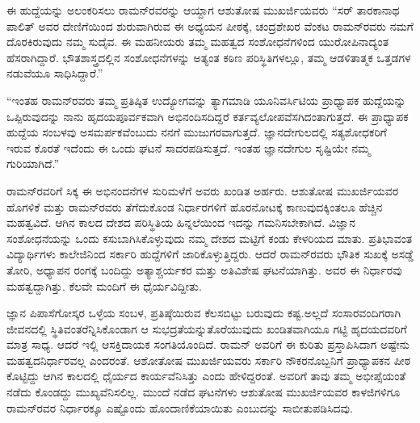 ಈ ಹುದ್ದೆಯನ್ನು ಅಲಂಕರಿಸಲು ರಾಮನ್‍ರವರನ್ನು ಆಯ್ದಾಗ ಆಶುತೋಷ ಮುಖರ್ಜಿಯವರು \enginline{-} “ಸರ್ ತಾರಕಾನಾಥ ಪಾಲಿತ್ ಅವರ ದೇಣಿಗೆಯಿಂದ ಶುರುವಾಗಿರುವ ಈ ಅಧ್ಯಯನ ಪೀಠಕ್ಕೆ, ಚಂದ್ರಶೇಖರ ವೆಂಕಟ ರಾಮನ್‍ರವರು ನಮಗೆ ದೊರಕಿರುವುದು ನಮ್ಮ ಸುದೈವ. ಈ ಮಹನೀಯರು ತಮ್ಮ ಮಹತ್ವದ ಸಂಶೋಧನೆಗಳಿಂದ ಯುರೋಪಿನಾದ್ಯಂತ ಹೆಸರಾಗಿದ್ದಾರೆ. ಭೌತಶಾಸ್ತ್ರದಲ್ಲಿನ ಸಂಶೋಧನೆಗಳನ್ನು ಅತ್ಯಂತ ಕಠಿಣ ಪರಿಸ್ಥಿತಿಗಳಲ್ಲೂ, ತಮ್ಮ ಆಡಳಿತಾತ್ಮಕ ಒತ್ತಡಗಳ ನಡುವೆಯೂ ಸಾಧಿಸಿದ್ದಾರೆ.”

“ಇಂತಹ ರಾಮನ್‍ರವರು ತಮ್ಮ ಪ್ರತಿಷ್ಠಿತ ಉದ್ಯೋಗವನ್ನು ತ್ಯಾಗಮಾಡಿ ಯೂನಿವರ್ಸಿಟಿಯ ಪ್ರಾಧ್ಯಾಪಕ ಹುದ್ದೆಯನ್ನು ಒಪ್ಪಿರುವುದನ್ನು ನಾನು ಹೃದಯಪೂರ್ವಕವಾಗಿ ಅಭಿನಂದಿಸದಿದ್ದರೆ ಕರ್ತವ್ಯಲೋಪವೆಸಗಿದಂತಾಗುತ್ತದೆ. ಈ ಪ್ರಾಧ್ಯಾಪಕ ಹುದ್ದೆಯ ಸಂಬಳವು ಅಸಮರ್ಪಕವೆಂಬುದು ನನಗೆ ಮುಜುಗರವಾಗುತ್ತದೆ. ಜ್ಞಾನದೇಗುಲದಲ್ಲಿ ಸತ್ಯಶೋಧಕರಿಗೆ ಇರುವ ಕೊರತೆ ಇದೆಂದು ಈ ಒಂದು ಘಟನೆ ಸಾದರಪಡಿಸುತ್ತದೆ. ಇಂತಹ ಜ್ಞಾನದೇಗುಲ ಸೃಷ್ಟಿಯೇ ನಮ್ಮ ಗುರಿಯಾಗಿದೆ.”

ರಾಮನ್‍ರವರಿಗೆ ಸಿಕ್ಕ ಈ ಅಭಿನಂದನೆಗಳ ಸುರಿಮಳೆಗೆ ಅವರು ಖಂಡಿತ ಅರ್ಹರು. ಆಶುತೋಷ ಮುಖರ್ಜಿಯವರ ಹೊಗಳಿಕೆ ಮತ್ತು ರಾಮನ್‍ರವರು ತೆಗೆದುಕೊಂಡ ನಿರ್ಧಾರಗಳಿಗೆ ಹೊರನೋಟಕ್ಕೆ ಕಾಣುವುದಕ್ಕಿಂತಲೂ ಹೆಚ್ಚಿನ ಮಹತ್ವವಿದೆ. ಆಗಿನ ಕಾಲದ ದೇಶದ ಪರಿಸ್ಥಿತಿಯ ಹಿನ್ನಲೆಯಿಂದ ಇದನ್ನು ಗಮನಿಸಬೇಕಾಗಿದೆ. ವಿಜ್ಞಾನ ಸಂಶೋಧನೆಯನ್ನು ಒಂದು ಕಸುಬಾಗಿಸಿಕೊಳ್ಳುವುದು ನಮ್ಮ ದೇಶದ ಮಟ್ಟಿಗೆ ಕಂಡು ಕೇಳರಿಯದ ಮಾತು. ಪ್ರತಿಭಾವಂತ ವಿದ್ಯಾರ್ಥಿಗಳು ಕಾಲೇಜಿನಿಂದ ಸರ್ಕಾರಿ ಹುದ್ದೆಗಳಿಗೆ ಜಾರಿಕೊಳ್ಳುತ್ತಿದ್ದರು. ಆದರೆ ರಾಮನ್‍ರವರು ಭೌತಿಕ ಸುಖಕ್ಕೆ ಅಸಡ್ಡೆ ತೋರಿ, ಅಧ್ಯಾಪನ ರಂಗಕ್ಕೆ ಬಂದಿದ್ದು ಅತ್ಯಾಶ್ಚರ್ಯಕರ ಮತ್ತು ಅತಿವಿಶೇಷ ಘಟನೆಯಾಗಿತ್ತು. ಅವರ ಈ ನಿರ್ಧಾರವು ಮಹತ್ವದ್ದಾಗಿತ್ತು. ಕೆಲವೇ ಮಂದಿಗೆ ಈ ಧೈರ್ಯವಿದ್ದೀತು.

ಜ್ಞಾನ ಪಿಪಾಸೆಗೋಸ್ಕರ ಒಳ್ಳೆಯ ಸಂಬಳ, ಪ್ರತಿಷ್ಠೆಯಿರುವ ಕೆಲಸಬಿಟ್ಟು ಬರುವುದು ಕಷ್ಟ.\break ಅಲ್ಲದೆ ಸಂಸಾರವಂದಿಗರಾಗಿ ಜೀವನದಲ್ಲಿ ಸ್ಥಿತಿವಂತರೆನ್ನಿಸಿಕೊಂಡಾಗ ಆ ಸುಭದ್ರತೆಯನ್ನು\break ತೊರೆಯುವುದು ಖಂಡಿತವಾಗಿಯೂ ಗಟ್ಟಿ ಹೃದಯದವರಿಗೆ ಮಾತ್ರ ಸಾಧ್ಯ. ಆದರೆ ಇಲ್ಲಿ ಆಸಕ್ತಿದಾಯಕ ಸಂಗತಿಯೊಂದಿದೆ. ರಾಮನ್ ಅವರಿಗೆ ಈ ಕುರಿತು ಪ್ರಸ್ತಾಪಿಸಿದಾಗ ಅಷ್ಟೇನು ಮಹತ್ವದ\break ನಿರ್ಧಾರವಲ್ಲ ಎಂದರಂತೆ. ಆಶೋತೋಷ ಮುಖರ್ಜಿಯವರು ಸರ್ಕಾರಿ ನೌಕರನೊಬ್ಬನಿಗೆ ಪ್ರಾಧ್ಯಾಪಕನ ಪೀಠ ಕೊಟ್ಟಿದ್ದು ಆಗಿನ ಕಾಲದಲ್ಲಿ ಧೈರ್ಯದ ಕಾರ್ಯವೆನಿಸಿತ್ತು ಎಂದು ಹೇಳಿದ್ದರಂತೆ. ಅವರಿಗೆ ತಾವು ತಮ್ಮ ಅಭೀಪ್ಸೆಯಂತೆ ನಡೆದು ಕೊಂಡದ್ದು ಮುಖ್ಯವೆನಿಸಲಿಲ್ಲ. ಮುಂದೆ ನಡೆದ ಘಟನೆಗಳು ಆಶುತೋಷ ಮುಖರ್ಜಿಯವರ ಕಾಳಜಿಗಳಿಗೂ ರಾಮನ್‍ರವರ ನಿರ್ಧಾರಕ್ಕೂ ಎಷ್ಟೊಂದು ಹೊಂದಾ\-ಣಿಕೆಯಾಯಿತು ಎಂಬುದನ್ನು ಸಾಬೀತುಪಡಿಸಿದವು.


